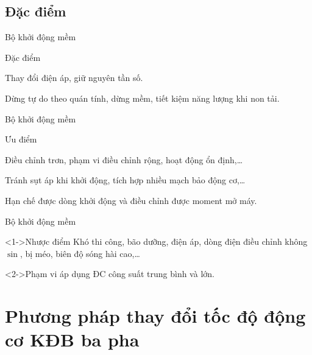 \documentclass[20pt]{beamer}
\begin{document}
\subsection*{Đặc điểm}
\begin{frame}{Bộ khởi động mềm}
	\begin{block}{Đặc điểm}
		\begin{list}{--}{}
			\justifying
			\item Thay đổi điện áp, giữ nguyên tần số. 
			\item Dừng tự do theo quán tính, dừng mềm, tiết kiệm năng lượng khi non tải.
		\end{list}
	\end{block}
\end{frame}

\begin{frame}{Bộ khởi động mềm}
	\begin{block}{Ưu điểm}
		\begin{list}{--}{}
			\justifying
			\item Điều chỉnh trơn, phạm vi điều chỉnh rộng, hoạt động ổn định,\ldots
			\item Tránh sụt áp khi khởi động, tích hợp nhiều mạch bảo động cơ,\ldots
			\item Hạn chế được dòng khởi động và điều chỉnh được moment mở máy.
		\end{list}
	\end{block}
\end{frame}

\begin{frame}{Bộ khởi động mềm}
	\justifying	
	\begin{block}<1->{Nhược điểm}
		Khó thi công, bão dưỡng, điện áp, dòng điện điều chỉnh không $\sin$, bị méo, biên độ sóng hài cao,\ldots
	\end{block}
	\begin{block}<2->{Phạm vi áp dụng}
		ĐC công suất trung bình và lớn.
	\end{block}
\end{frame}


\section[Thay đổi tốc độ động cơ KĐB ba pha]{Phương pháp thay đổi tốc độ động cơ KĐB ba pha}
\end{document}
